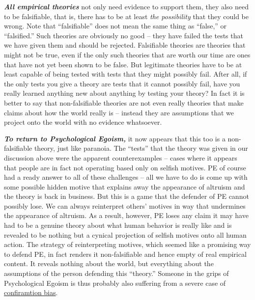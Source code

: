 \documentclass[12pt, openany]{book}
\begin{document}
\textbf{\emph{All empirical theories}} not only need evidence to support them, they also need to be falsifiable, that is, there has to be at least \emph{the possibility} that they could be wrong. Note that ``falsifiable'' does not mean the same thing as ``false,'' or ``falsified.'' Such theories are obviously no good -- they have failed the tests that we have given them and should be rejected. Falsifiable theories are theories that might not be true, even if the only such theories that are worth our time are ones that have not yet been shown to be false. But legitimate theories have to be at least capable of being tested with tests that they might possibly fail. After all, if the only tests you give a theory are tests that it cannot possibly fail, have you really learned anything new about anything by testing your theory? In fact it is better to say that non-falsifiable theories are not even really theories that make claims about how the world really is -- instead they are assumptions that we project onto the world with no evidence whatsoever.

\textbf{\emph{To return to Psychological Egoism,}} it now appears that this too is a non-falsifiable theory, just like paranoia. The ``tests'' that the theory was given in our discussion above were the apparent counterexamples -- cases where it appears that people are in fact not operating based only on selfish motives. PE of course had a ready answer to all of these challenges -- all we have to do is come up with some possible hidden motive that explains away the appearance of altruism and the theory is back in business. But this is a game that the defender of PE cannot possibly lose. We can always reinterpret others' motives in way that undermines the appearance of altruism. As a result, however, PE loses any claim it may have had to be a genuine theory about what human behavior is really like and is revealed to be nothing but a cynical projection of selfish motives onto all human action. The strategy of reinterpreting motives, which seemed like a promising way to defend PE, in fact renders it non-falsifiable and hence empty of real empirical content. It reveals nothing about the world, but everything about the assumptions of the person defending this ``theory.'' Someone in the grips of Psychological Egoism is thus probably also suffering from a severe case of \protect\hyperlink{confirmation-bias}{confiramtion bias}.
\end{document}
